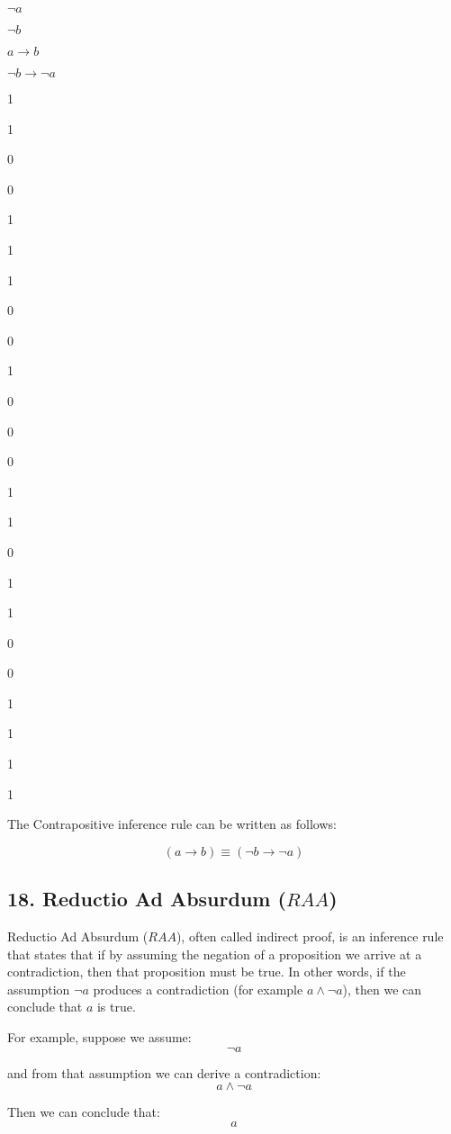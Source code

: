 \(\lnot a\)

\(\lnot b\)

\(a \rightarrow b\)

\(\lnot b \rightarrow \lnot a\)

1

1

0

0

1

1

1

0

0

1

0

0

0

1

1

0

1

1

0

0

1

1

1

1

The Contrapositive inference rule can be written as follows:

\[
(a \rightarrow b) \equiv (\lnot b \rightarrow \lnot a)
\]

\subsection{\texorpdfstring{18. Reductio Ad Absurdum
(\(RAA\))}{18. Reductio Ad Absurdum (RAA)}}\label{reductio-ad-absurdum-raa}

Reductio Ad Absurdum (\(RAA\)), often called indirect proof, is an
inference rule that states that if by assuming the negation of a
proposition we arrive at a contradiction, then that proposition must be
true. In other words, if the assumption \(\neg a\) produces a
contradiction (for example \(a \land \neg a\)), then we can conclude
that \(a\) is true.

For example, suppose we assume:\\
\[\neg a\]

and from that assumption we can derive a contradiction:\\
\[a \land \neg a\]

Then we can conclude that:\\
\[a\]

